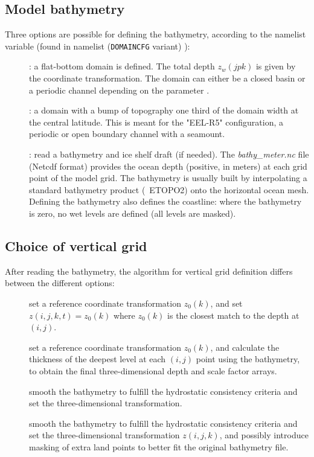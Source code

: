 \documentclass[../main/NEMO_manual]{subfiles}
\begin{document}
\subsection{Model bathymetry}
\label{subsec:DOMCFG_bathy}

Three options are possible for defining the bathymetry, according to the namelist variable
 (found in  namelist (\texttt{DOMAINCFG} variant) ):
\begin{description}
\item [{}]: a flat-bottom domain is defined.
  The total depth $z_w (jpk)$ is given by the coordinate transformation.
  The domain can either be a closed basin or a periodic channel depending on the parameter .
\item [{}]: a domain with a bump of topography one third of the domain width at the central latitude.
  This is meant for the "EEL-R5" configuration, a periodic or open boundary channel with a seamount.
\item [{}]: read a bathymetry and ice shelf draft (if needed).
  The \textit{bathy\_meter.nc} file (Netcdf format) provides the ocean depth (positive, in meters) at
  each grid point of the model grid.
  The bathymetry is usually built by interpolating a standard bathymetry product (\eg\ ETOPO2) onto
  the horizontal ocean mesh.
  Defining the bathymetry also defines the coastline: where the bathymetry is zero,
  no wet levels are defined (all levels are masked).
\end{description}

\subsection{Choice of vertical grid}
\label{sec:DOMCFG_vgrd}

After reading the bathymetry, the algorithm for vertical grid definition differs between the different options:
\begin{description}
\item [] set a reference coordinate transformation $z_0(k)$, and set $z(i,j,k,t) = z_0(k)$ where $z_0(k)$ is the closest match to the depth at $(i,j)$.
\item [] set a reference coordinate transformation $z_0(k)$, and calculate the thickness of the deepest level at
  each $(i,j)$ point using the bathymetry, to obtain the final three-dimensional depth and scale factor arrays.
\item [] smooth the bathymetry to fulfill the hydrostatic consistency criteria and
  set the three-dimensional transformation.
\item [] smooth the bathymetry to fulfill the hydrostatic consistency criteria and
  set the three-dimensional transformation $z(i,j,k)$,
  and possibly introduce masking of extra land points to better fit the original bathymetry file.
\end{description}
\end{document}
